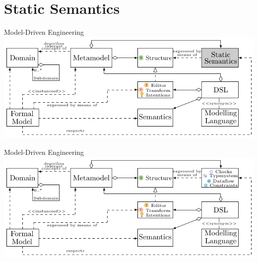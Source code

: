 	\section{Static Semantics}
	
	\begin{frame}{Model-Driven Engineering}
		\includegraphics[width=\textwidth]{tikz/mdsd_concept_5.pdf}
	\end{frame}
	
	\begin{frame}[noframenumbering]{Model-Driven Engineering}
		\includegraphics[width=\textwidth]{tikz/mdsd_concept_6.pdf}
	\end{frame}
		
